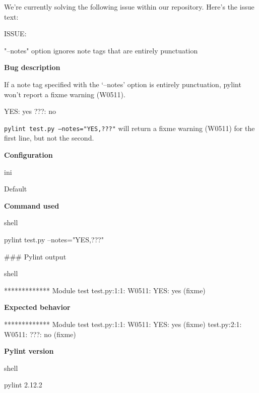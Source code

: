 {
\captionsetup{type=figure}
\begin{issuebox}We're currently solving the following issue within our repository. Here's the issue text:

ISSUE:

"--notes" option ignores note tags that are entirely punctuation

{\large \textbf{Bug description}}



If a note tag specified with the `--notes' option is entirely punctuation, pylint won't report a fixme warning (W0511).



\begin{CodeVerbatim}[breaklines=true, breakanywhere=true]
YES: yes
???: no
\end{CodeVerbatim}

\texttt{pylint test.py --notes="YES,???"} will return a fixme warning (W0511) for the first line, but not the second.

\textbf{Configuration}

ini\begin{CodeVerbatim}[breaklines=true, breakanywhere=true]
Default
\end{CodeVerbatim}
{\large \textbf{Command used}}

\begin{CodeVerbatim}[breaklines=true, breakanywhere=true]
shell
\end{CodeVerbatim}
pylint test.py --notes="YES,???"

\begin{CodeVerbatim}[breaklines=true, breakanywhere=true]
### Pylint output

\end{CodeVerbatim}
shell\begin{CodeVerbatim}[breaklines=true, breakanywhere=true]
************* Module test
test.py:1:1: W0511: YES: yes (fixme)
\end{CodeVerbatim}
{\large \textbf{Expected behavior}}

\begin{CodeVerbatim}[breaklines=true, breakanywhere=true]
************* Module test
test.py:1:1: W0511: YES: yes (fixme)
test.py:2:1: W0511: ???: no (fixme)
\end{CodeVerbatim}
{\large \textbf{Pylint version}}

\begin{CodeVerbatim}[breaklines=true, breakanywhere=true]
shell
\end{CodeVerbatim}
pylint 2.12.2


\end{issuebox}}
